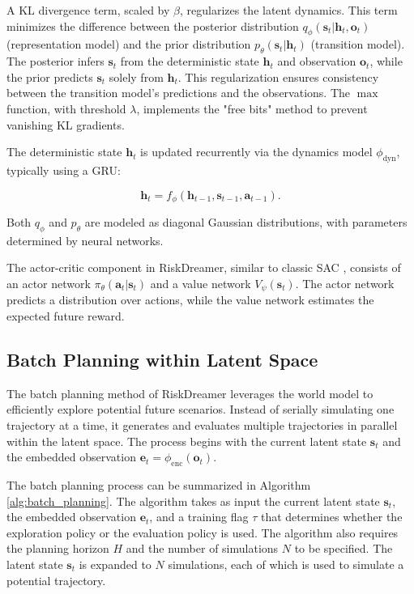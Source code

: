     A KL divergence term, scaled by $\beta$, regularizes the latent dynamics.  This term minimizes the difference between the posterior distribution $q_{\phi}(\mathbf{s}_t | \mathbf{h}_{t}, \mathbf{o}_t)$ (representation model) and the prior distribution $p_{\theta}(\mathbf{s}_t | \mathbf{h}_{t})$ (transition model).  The posterior infers $\mathbf{s}_t$ from the deterministic state $\mathbf{h}_t$ and observation $\mathbf{o}_t$, while the prior predicts $\mathbf{s}_t$ solely from $\mathbf{h}_t$.  This regularization ensures consistency between the transition model's predictions and the observations.  The $\max$ function, with threshold $\lambda$, implements the "free bits" method to prevent vanishing KL gradients.
    
    The deterministic state $\mathbf{h}_t$ is updated recurrently via the dynamics model $\phi_{\text{dyn}}$, typically using a GRU:
    
    \begin{equation}
    \mathbf{h}_t = f_{\phi}(\mathbf{h}_{t-1}, \mathbf{s}_{t-1}, \mathbf{a}_{t-1}).
    \end{equation}
    
    Both $q_{\phi}$ and $p_{\theta}$ are modeled as diagonal Gaussian distributions, with parameters determined by neural networks.

The actor-critic component in RiskDreamer, similar to classic SAC \cite{SAC}, consists of an actor network $\pi_{\theta}(\mathbf{a}_t | \mathbf{s}_t)$ and a value network $V_{\psi}(\mathbf{s}_t)$. The actor network predicts a distribution over actions, while the value network estimates the expected future reward.

\subsection{Batch Planning within Latent Space}
The batch planning method of RiskDreamer leverages the world model to efficiently explore potential future scenarios. Instead of serially simulating one trajectory at a time, it generates and evaluates multiple trajectories in parallel within the latent space. The process begins with the current latent state $\mathbf{s}_t$ and the embedded observation $\mathbf{e}_t = \phi_{\text{enc}}(\mathbf{o}_t)$. 

The batch planning process can be summarized in Algorithm \ref{alg:batch_planning}. The algorithm takes as input the current latent state $\mathbf{s}_t$, the embedded observation $\mathbf{e}_t$, and a training flag $\tau$ that determines whether the exploration policy or the evaluation policy is used. The algorithm also requires the planning horizon $H$ and the number of simulations $N$ to be specified. The latent state $\mathbf{s}_t$ is expanded to $N$ simulations, each of which is used to simulate a potential trajectory.




